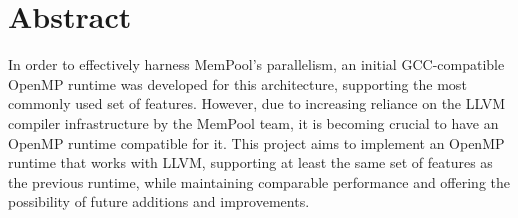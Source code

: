 \chapter*{Abstract}

In order to effectively harness MemPool's parallelism, an initial GCC-compatible OpenMP runtime was
developed for this architecture, supporting the most commonly used set of features. However, due to
increasing reliance on the LLVM compiler infrastructure by the MemPool team, it is becoming crucial
to have an OpenMP runtime compatible for it. This project aims to implement an OpenMP runtime that
works with LLVM, supporting at least the same set of features as the previous runtime, while
maintaining comparable performance and offering the possibility of future additions and
improvements.

%
%
%
